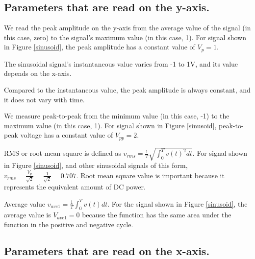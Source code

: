 \documentclass{ximera}
\begin{document}
\subsection{Parameters that are read on the y-axis.}

\begin{definition}
We read the peak amplitude on the y-axis from the average value of the signal (in this case, zero) to the signal's maximum value (in this case, 1). For signal shown in Figure \ref{sinusoid}, the peak  amplitude has a constant value of $V_p=1$. 
\end{definition}


\begin{definition}
The sinusoidal signal's instantaneous value varies from -1 to 1V, and its value depends on the x-axis. 

Compared to the instantaneous value, the peak amplitude is always constant, and it does not vary with time. 
\end{definition}

\begin{definition}
We measure peak-to-peak from the minimum value  (in this case, -1) to the maximum value (in this case, 1).  For signal shown in Figure \ref{sinusoid}, peak-to-peak voltage has a constant value of  $V_{pp}=2$.
\end{definition}

\begin{definition}
RMS or root-mean-square is defined as $v_{rms}=\frac{1}{T} \sqrt{\int_0^T v(t)^2 dt}$. For signal shown in Figure \ref{sinusoid}, and other sinusoidal signals of this form,  $v_{rms}=\frac{V_p}{\sqrt{2}}=\frac{1}{\sqrt{2}}=0.707$. Root mean square value is important because it represents the equivalent amount of DC power.
\end{definition}


\begin{definition}
Average value $v_{ave1}=\frac{1}{T} \int_0^T v(t) dt$. For the signal shown in Figure \ref{sinusoid}, the average value is $V_{ave1}=0$ because the function has the same area under the function in the positive and negative cycle. 
\end{definition}

\subsection{Parameters that are read on the x-axis.}
\end{document}
